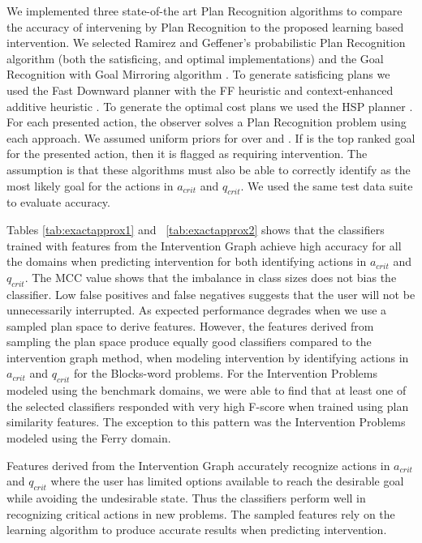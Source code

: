 We implemented three state-of-the art Plan Recognition algorithms to compare the accuracy of intervening by Plan Recognition to the proposed learning based intervention. 
We selected Ramirez and Geffener's probabilistic Plan Recognition algorithm \cite{ramirez2010probabilistic} (both the satisficing, and optimal implementations) and the Goal Recognition with Goal Mirroring algorithm \cite{vered2018goalrec}. 
To generate satisficing plans we used the Fast Downward planner with the FF heuristic and context-enhanced additive heuristic \cite{helmert2006}.
To generate the optimal cost plans we used the HSP planner \cite{bonet01planningas}.
For each presented action, the observer solves a Plan Recognition problem using each approach. 
We assumed uniform priors for over \undesired and \desired. 
If \undesired is the top ranked goal for the presented action, then it is flagged as requiring intervention. 
The assumption is that these algorithms must also be able to correctly identify \undesired as the most likely goal for the actions in $a_{crit}$ and $q_{crit}$. 
We used the same test data suite to evaluate accuracy.

Tables \ref{tab:exactapprox1} and ~\ref{tab:exactapprox2} shows that the classifiers trained with features from the Intervention Graph achieve high accuracy for all the domains when predicting intervention for both identifying actions in $a_{crit}$ and $q_{crit}$. 
The MCC value shows that the imbalance in class sizes does not bias the classifier. 
Low false positives and false negatives suggests that the user will not be unnecessarily interrupted. 
As expected performance degrades when we use a sampled plan space to derive features.
However, the features derived from sampling the plan space produce equally good classifiers compared to the intervention graph method, when  modeling intervention by identifying actions in $a_{crit}$ and $q_{crit}$  for the Blocks-word problems.
For the Intervention Problems modeled using the benchmark domains, we were able to find that at least one of the selected classifiers responded with very high F-score when trained using plan similarity features. 
The exception to this pattern was the Intervention Problems modeled using the Ferry domain.

Features derived from the Intervention Graph accurately recognize actions in $a_{crit}$ and $q_{crit}$ where the user has limited options available to reach the desirable goal while avoiding the undesirable state. 
Thus the classifiers perform well in recognizing critical actions in new problems. 
The sampled features rely on the learning algorithm to produce accurate results when predicting intervention. 

